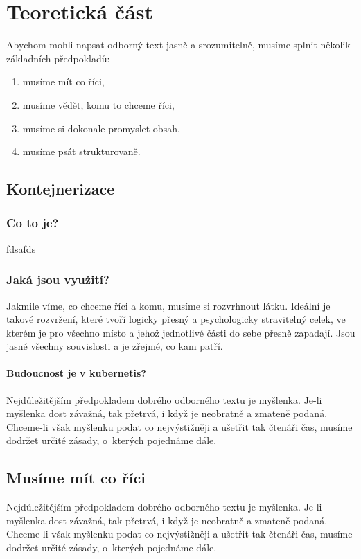 ﻿\chapter{Teoretická část}
Abychom mohli napsat odborný text jasně a srozumitelně, musíme splnit několik základních předpokladů\cite{vut-zkousky}:
\begin{enumerate}
    \item musíme mít co říci,
    \item musíme vědět, komu to chceme říci,
    \item musíme si dokonale promyslet obsah,
    \item musíme psát strukturovaně.
\end{enumerate}

\section{Kontejnerizace}

\subsection{Co to je?}
fdsafds

\subsection{Jaká jsou využití?}
Jakmile víme, co chceme říci a komu, musíme si rozvrhnout látku.
Ideální je takové rozvržení, které tvoří logicky přesný a psychologicky stravitelný celek, ve kterém je pro všechno místo a jehož jednotlivé části do sebe přesně zapadají.
Jsou jasné všechny souvislosti a je zřejmé, co kam patří.

\subsubsection{Budoucnost je v kubernetis?}
Nejdůležitějším předpokladem dobrého odborného textu je myšlenka.
Je-li myšlenka dost závažná, tak přetrvá, i když je neobratně a zmateně podaná.
Chceme-li však myšlenku podat co nejvýstižněji a ušetřit tak čtenáři čas, musíme dodržet určité zásady, o~kterých pojednáme dále.

\section{Musíme mít co říci}
Nejdůležitějším předpokladem dobrého odborného textu je myšlenka.
Je-li myšlenka dost závažná, tak přetrvá, i když je neobratně a zmateně podaná.
Chceme-li však myšlenku podat co nejvýstižněji a ušetřit tak čtenáři čas, musíme dodržet určité zásady, o~kterých pojednáme dále.

